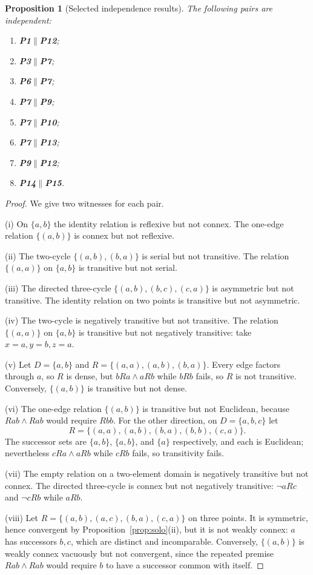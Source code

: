 \documentclass[11pt,a4paper,reqno]{amsart}
\newtheorem{proposition}{Proposition}[section]
\theoremstyle{definition}
\theoremstyle{remark}
\newcommand{\prop}[1]{\textbf{P#1}}
\begin{document}
\begin{proposition}[Selected independence results]\label{prop:independence}
The following pairs are independent:
\begin{enumerate}[label=(\roman*),noitemsep]
\item \prop{1}$\parallel$\prop{12};
\item \prop{3}$\parallel$\prop{7};
\item \prop{6}$\parallel$\prop{7};
\item \prop{7}$\parallel$\prop{9};
\item \prop{7}$\parallel$\prop{10};
\item \prop{7}$\parallel$\prop{13};
\item \prop{9}$\parallel$\prop{12};
\item \prop{14}$\parallel$\prop{15}.
\end{enumerate}
\end{proposition}
\begin{proof}
We give two witnesses for each pair.

(i) On $\{a,b\}$ the identity relation is reflexive but not connex.  The
one-edge relation $\{(a,b)\}$ is connex but not reflexive.

(ii) The two-cycle $\{(a,b),(b,a)\}$ is serial but not transitive.  The relation
$\{(a,a)\}$ on $\{a,b\}$ is transitive but not serial.

(iii) The directed three-cycle
$\{(a,b),(b,c),(c,a)\}$ is asymmetric but not transitive.  The identity
relation on two points is transitive but not asymmetric.

(iv) The two-cycle is negatively transitive but not transitive.  The relation
$\{(a,a)\}$ on $\{a,b\}$ is transitive but not negatively transitive: take
$x=a,y=b,z=a$.

(v) Let $D=\{a,b\}$ and
$R=\{(a,a),(a,b),(b,a)\}$.  Every edge factors through $a$, so $R$ is dense,
but $bRa\wedge aRb$ while $bRb$ fails, so $R$ is not transitive.  Conversely,
$\{(a,b)\}$ is transitive but not dense.

(vi) The one-edge relation $\{(a,b)\}$ is transitive but not Euclidean,
because $Rab\wedge Rab$ would require $Rbb$.  For the other direction, on
$D=\{a,b,c\}$ let
\[
R=\{(a,a),(a,b),(b,a),(b,b),(c,a)\}.
\]
The successor sets are $\{a,b\}$, $\{a,b\}$, and $\{a\}$ respectively, and
each is Euclidean; nevertheless $cRa\wedge aRb$ while $cRb$ fails, so
transitivity fails.

(vii) The empty relation on a two-element domain is negatively transitive but
not connex.  The directed three-cycle is connex but not negatively transitive:
$\neg aRc$ and $\neg cRb$ while $aRb$.

(viii) Let
$R=\{(a,b),(a,c),(b,a),(c,a)\}$ on three points.  It is symmetric, hence
convergent by Proposition~\ref{prop:solo}(ii), but it is not weakly connex:
$a$ has successors $b,c$, which are distinct and incomparable.  Conversely,
$\{(a,b)\}$ is weakly connex vacuously but not convergent, since the repeated
premise $Rab\wedge Rab$ would require $b$ to have a successor common with
itself.
\end{proof}
\end{document}

